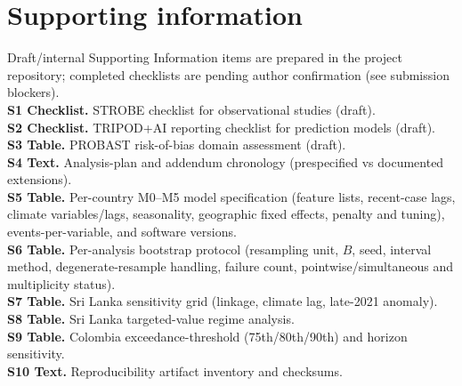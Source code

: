 \documentclass[11pt,a4paper]{article}
\begin{document}
\section*{Supporting information}
\noindent Draft/internal Supporting Information items are prepared in the project repository; completed checklists are pending author confirmation (see submission blockers).\\[0.3em]
\noindent\textbf{S1 Checklist.} STROBE checklist for observational studies (draft).\\
\textbf{S2 Checklist.} TRIPOD+AI reporting checklist for prediction models (draft).\\
\textbf{S3 Table.} PROBAST risk-of-bias domain assessment (draft).\\
\textbf{S4 Text.} Analysis-plan and addendum chronology (prespecified vs documented extensions).\\
\textbf{S5 Table.} Per-country M0--M5 model specification (feature lists, recent-case lags, climate variables/lags, seasonality, geographic fixed effects, penalty and tuning), events-per-variable, and software versions.\\
\textbf{S6 Table.} Per-analysis bootstrap protocol (resampling unit, $B$, seed, interval method, degenerate-resample handling, failure count, pointwise/simultaneous and multiplicity status).\\
\textbf{S7 Table.} Sri Lanka sensitivity grid (linkage, climate lag, late-2021 anomaly).\\
\textbf{S8 Table.} Sri Lanka targeted-value regime analysis.\\
\textbf{S9 Table.} Colombia exceedance-threshold (75th/80th/90th) and horizon sensitivity.\\
\textbf{S10 Text.} Reproducibility artifact inventory and checksums.
\end{document}
